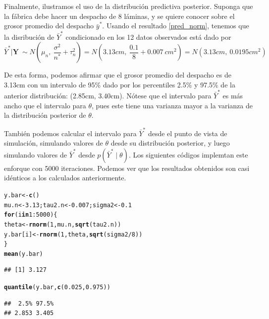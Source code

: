 \documentclass[10pt,openright]{book}\usepackage[]{graphicx}\usepackage[]{color}
\makeatletter
\newcommand{\hlnum}[1]{\textcolor[rgb]{0.686,0.059,0.569}{#1}}%
\newcommand{\hlopt}[1]{\textcolor[rgb]{0,0,0}{#1}}%
\newcommand{\hlstd}[1]{\textcolor[rgb]{0.345,0.345,0.345}{#1}}%
\newcommand{\hlkwa}[1]{\textcolor[rgb]{0.161,0.373,0.58}{\textbf{#1}}}%
\newcommand{\hlkwb}[1]{\textcolor[rgb]{0.69,0.353,0.396}{#1}}%
\newcommand{\hlkwd}[1]{\textcolor[rgb]{0.737,0.353,0.396}{\textbf{#1}}}%
\newenvironment{kframe}{%
 \def\at@end@of@kframe{}%
 \ifinner\ifhmode%
  \def\at@end@of@kframe{\end{minipage}}%
  \begin{minipage}{\columnwidth}%
 \fi\fi%
 \def\FrameCommand##1{\hskip\@totalleftmargin \hskip-\fboxsep
 \colorbox{shadecolor}{##1}\hskip-\fboxsep
     \hskip-\linewidth \hskip-\@totalleftmargin \hskip\columnwidth}%
 \MakeFramed {\advance\hsize-\width
   \@totalleftmargin\z@ \linewidth\hsize
   \@setminipage}}%
 {\par\unskip\endMakeFramed%
 \at@end@of@kframe}
\newenvironment{knitrout}{}{} %
\makeatother
\begin{document}
\begin{Eje}
    Finalmente, ilustramos el uso de la distribuci\'on predictiva posterior. Suponga que la f\'abrica debe hacer un despacho de 8 l\'aminas, y se quiere conocer sobre el grosor promedio del despacho $\bar{y}^*$. Usando el resultado \ref{pred_norm}, tenemos que la disribuci\'on de $\bar{Y}^*$ condicionado en los 12 datos observados est\'a dado por 
    \begin{equation*}
    \bar{Y}^*|\mathbf{Y}\ \sim N\left(\mu_n,\ \frac{\sigma^2}{n^*}+\tau^2_n\right) = N\left(3.13cm,\ \frac{0.1}{8}+0.007\ cm^2\right) = N(3.13cm,\ 0.0195cm^2)
    \end{equation*}
    
    De esta forma, podemos afirmar que el grosor promedio del despacho es de 3.13cm con un intervalo de 95\% dado por los percentiles 2.5\% y 97.5\% de la anterior distribuci\'on: (2.85cm, 3.40cm). N\'otese que el intervalo para $\bar{Y}^{*}$ es m\'as ancho que el intervalo para $\theta$, pues este tiene una varianza mayor a la varianza de la distribuci\'on posterior de $\theta$.
    
    Tambi\'en podemos calcular el intervalo para $\bar{Y}^*$ desde el punto de vista de simulaci\'on, simulando valores de $\theta$ desde su distribuci\'on posterior, y luego simulando valores de $\bar{Y}^*$ desde $p(\bar{Y}^*\mid\theta)$. Los siguientes c\'odigos implemtan este enforque con 5000 iteraciones. Podemos ver que los resultados obtenidos son casi id\'enticos a los calculados anteriormente.
\begin{knitrout}
\color{fgcolor}\begin{kframe}
\begin{alltt}
\hlstd{y.bar} \hlkwb{<-} \hlkwd{c}\hlstd{()}
\hlstd{mu.n} \hlkwb{<-} \hlnum{3.13}\hlstd{; tau2.n} \hlkwb{<-} \hlnum{0.007}\hlstd{; sigma2} \hlkwb{<-} \hlnum{0.1}
\hlkwa{for}\hlstd{(i} \hlkwa{in} \hlnum{1}\hlopt{:}\hlnum{5000}\hlstd{)\{}
  \hlstd{theta} \hlkwb{<-} \hlkwd{rnorm}\hlstd{(}\hlnum{1}\hlstd{, mu.n,} \hlkwd{sqrt}\hlstd{(tau2.n))}
  \hlstd{y.bar[i]} \hlkwb{<-} \hlkwd{rnorm}\hlstd{(}\hlnum{1}\hlstd{, theta,} \hlkwd{sqrt}\hlstd{(sigma2}\hlopt{/}\hlnum{8}\hlstd{))}
\hlstd{\}}
\hlkwd{mean}\hlstd{(y.bar)}
\end{alltt}
\begin{verbatim}
## [1] 3.127
\end{verbatim}
\begin{alltt}
\hlkwd{quantile}\hlstd{(y.bar,} \hlkwd{c}\hlstd{(}\hlnum{0.025}\hlstd{,}\hlnum{0.975}\hlstd{))}
\end{alltt}
\begin{verbatim}
##  2.5% 97.5% 
## 2.853 3.405
\end{verbatim}
\end{kframe}
\end{knitrout}
    \end{Eje}
    
\end{document}
